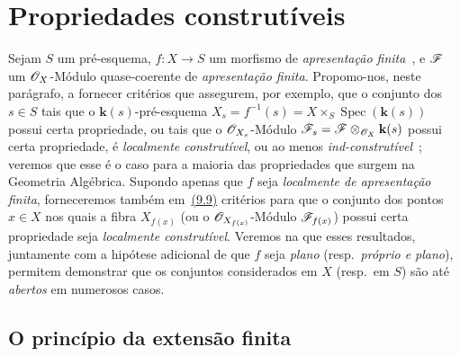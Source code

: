 \section{Propriedades construtíveis}
\label{section:IV.9}

Sejam $S$ um pré-esquema, $f:X\to S$ um morfismo de \emph{apresentação finita}~,
e $\mathscr{F}$ um $\mathscr{O}_X$-Módulo quase-coerente de \emph{apresentação finita}.
Propomo-nos, neste parágrafo, a fornecer critérios que assegurem, por exemplo, que o conjunto dos $s\in S$ tais que o $\mathbf{k}(s)$-pré-esquema $X_s=f^{-1}(s)=X\times_S\operatorname{Spec}(\mathbf{k}(s))$ possui certa propriedade, ou tais que o $\mathscr{O}_{X_s}$-Módulo $\mathscr{F}_s=\mathscr{F}\otimes_{\mathscr{O}_X}\mathbf{k}(s)$ possui certa propriedade, é \emph{localmente construtível}, ou ao menos \emph{ind-construtível}~; veremos que esse é o caso para a maioria das propriedades que surgem na Geometria Algébrica.
Supondo apenas que $f$ seja \emph{localmente de apresentação finita}, forneceremos também em~{\hyperlink{ega4.c04.subsec.9-9}{(9.9)}} critérios para que o conjunto dos pontos $x\in X$ nos quais a fibra $X_{f(x)}$ (ou o $\mathscr{O}_{X_{f(x)}}$-Módulo $\mathscr{F}_{f(x)}$) possui certa propriedade seja \emph{localmente construtível}.
Veremos na  que esses resultados, juntamente com a hipótese adicional de que $f$ seja \emph{plano} (resp.\ \emph{próprio e plano}), permitem demonstrar que os conjuntos considerados em $X$ (resp.\ em $S$) são até \emph{abertos} em numerosos casos.

\subsection{O princípio da extensão finita}
\label{subsection:IV.9.1}

